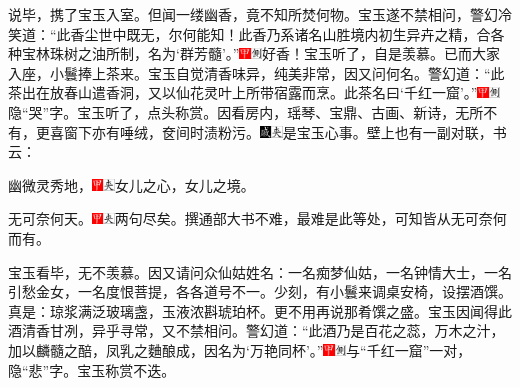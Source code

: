 说毕，携了宝玉入室。但闻一缕幽香，竟不知所焚何物。宝玉遂不禁相问，警幻冷笑道：“此香尘世中既无，尔何能知！此香乃系诸名山胜境内初生异卉之精，合各种宝林珠树之油所制，名为‘群芳髓’。”{\includegraphics[width=3mm]{../Images/00002}\includegraphics[width=3mm]{../Images/00011}\footnotesize \kaishu 好香！}宝玉听了，自是羡慕。已而大家入座，小鬟捧上茶来。宝玉自觉清香味异，纯美非常，因又问何名。警幻道：“此茶出在放春山遣香洞，又以仙花灵叶上所带宿露而烹。此茶名曰‘千红一窟’。”{\includegraphics[width=3mm]{../Images/00002}\includegraphics[width=3mm]{../Images/00011}\footnotesize \kaishu 隐“哭”字。}宝玉听了，点头称赏。因看房内，瑶琴、宝鼎、古画、新诗，无所不有，更喜窗下亦有唾绒，奁间时渍粉污。{\includegraphics[width=3mm]{../Images/00005}\includegraphics[width=3mm]{../Images/00012}\footnotesize \kaishu 是宝玉心事。}壁上也有一副对联，书云：

幽微灵秀地，{\includegraphics[width=3mm]{../Images/00002}\includegraphics[width=3mm]{../Images/00012}\footnotesize \kaishu 女儿之心，女儿之境。}

无可奈何天。{\includegraphics[width=3mm]{../Images/00002}\includegraphics[width=3mm]{../Images/00012}\footnotesize \kaishu 两句尽矣。撰通部大书不难，最难是此等处，可知皆从无可奈何而有。}

宝玉看毕，无不羡慕。因又请问众仙姑姓名：一名痴梦仙姑，一名钟情大士，一名引愁金女，一名度恨菩提，各各道号不一。少刻，有小鬟来调桌安椅，设摆酒馔。真是：琼浆满泛玻璃盏，玉液浓斟琥珀杯。更不用再说那肴馔之盛。宝玉因闻得此酒清香甘冽，异乎寻常，又不禁相问。警幻道：“此酒乃是百花之蕊，万木之汁，加以麟髓之醅，凤乳之麯酿成，因名为‘万艳同杯’。”{\includegraphics[width=3mm]{../Images/00002}\includegraphics[width=3mm]{../Images/00011}\footnotesize \kaishu 与“千红一窟”一对，隐“悲”字。}宝玉称赏不迭。

